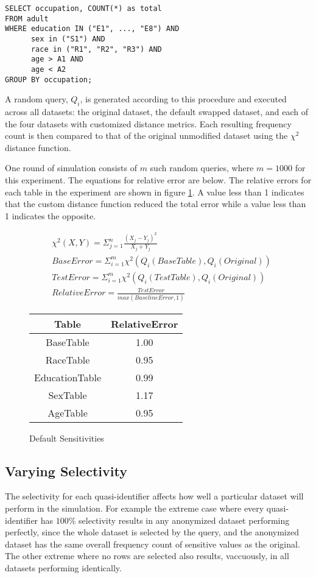 \begin{verbatim}
SELECT occupation, COUNT(*) as total
FROM adult
WHERE education IN ("E1", ..., "E8") AND
      sex in ("S1") AND
      race in ("R1", "R2", "R3") AND
      age > A1 AND
      age < A2
GROUP BY occupation;
\end{verbatim}

A random query, $Q_i$, is generated according to this procedure and executed across all datasets: the original dataset, the default swapped dataset, and each of the four datasets with customized distance metrics. Each resulting frequency count is then compared to that of the original unmodified dataset using the $\chi^2$ distance function.

One round of simulation consists of $m$ such random queries, where $m=1000$ for this experiment. The equations for relative error are below. The relative errors for each table in the experiment are shown in figure \ref{fig:relativeErrorDefault}. A value less than 1 indicates that the custom distance function reduced the total error while a value less than 1 indicates the opposite.

\begin{align*}
& \chi^2(X, Y) = \Sigma_{j=1}^{n} \frac{(X_j - Y_j)^2}{X_j + Y_j} \tag{1}\\
& BaseError = \Sigma_{i=1}^{m} \chi^2(Q_i(BaseTable), Q_i(Original)) \tag{2} \\
& TestError = \Sigma_{i=1}^{m} \chi^2(Q_i(TestTable), Q_i(Original)) \tag{3} \\
& RelativeError = \frac{TestError}{max(BaselineError, 1)} \tag{4}
\end{align*}


\begin{figure}
\centering
\begin{tabular}{|c||c|}
\hline
Table & RelativeError \\
\hline
\hline
BaseTable & 1.00 \\
\hline
RaceTable & 0.95 \\
\hline
EducationTable & 0.99 \\
\hline
SexTable & 1.17 \\
\hline
AgeTable & 0.95 \\
\hline
\end{tabular}
\caption{Default Sensitivities}
\label{fig:relativeErrorDefault}
\end{figure}

\subsection{Varying Selectivity}
The selectivity for each quasi-identifier affects how well a particular dataset will perform in the simulation. For example the extreme case where every quasi-identifier has $100\%$ selectivity results in any anonymized dataset performing perfectly, since the whole dataset is selected by the query, and the anonymized dataset has the same overall frequency count of sensitive values as the original. The other extreme where no rows are selected also results, vaccuously, in all datasets performing identically.

